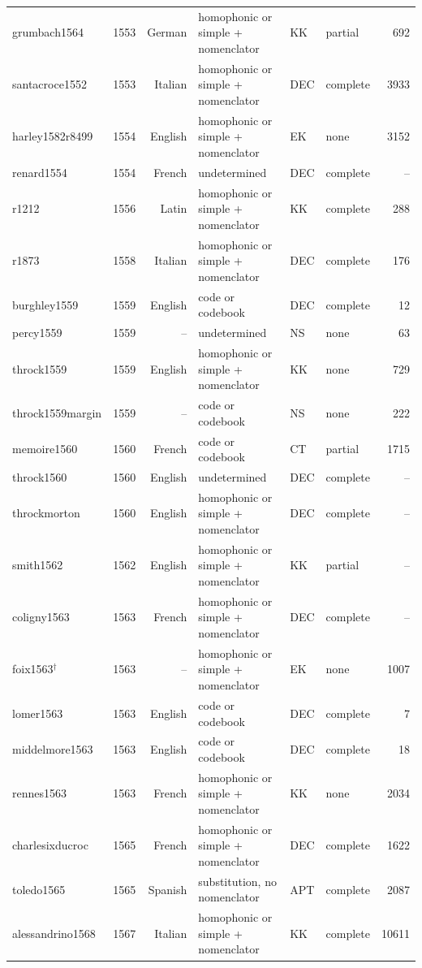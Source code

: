 {\begin{longtable}{@{}llrlllr@{}}
grumbach1564 & 1553 & German & homophonic or simple + nomenclator & KK & partial & 692 \\
santacroce1552 & 1553 & Italian & homophonic or simple + nomenclator & DEC & complete & 3933 \\
harley1582r8499 & 1554 & English & homophonic or simple + nomenclator & EK & none & 3152 \\
renard1554 & 1554 & French & undetermined & DEC & complete & -- \\
r1212 & 1556 & Latin & homophonic or simple + nomenclator & KK & complete & 288 \\
r1873 & 1558 & Italian & homophonic or simple + nomenclator & DEC & complete & 176 \\
burghley1559 & 1559 & English & code or codebook & DEC & complete & 12 \\
percy1559 & 1559 & -- & undetermined & NS & none & 63 \\
throck1559 & 1559 & English & homophonic or simple + nomenclator & KK & none & 729 \\
throck1559margin & 1559 & -- & code or codebook & NS & none & 222 \\
memoire1560 & 1560 & French & code or codebook & CT & partial & 1715 \\
throck1560 & 1560 & English & undetermined & DEC & complete & -- \\
throckmorton & 1560 & English & homophonic or simple + nomenclator & DEC & complete & -- \\
smith1562 & 1562 & English & homophonic or simple + nomenclator & KK & partial & -- \\
coligny1563 & 1563 & French & homophonic or simple + nomenclator & DEC & complete & -- \\
foix1563$^\dagger$ & 1563 & -- & homophonic or simple + nomenclator & EK & none & 1007 \\
lomer1563 & 1563 & English & code or codebook & DEC & complete & 7 \\
middelmore1563 & 1563 & English & code or codebook & DEC & complete & 18 \\
rennes1563 & 1563 & French & homophonic or simple + nomenclator & KK & none & 2034 \\
charlesixducroc & 1565 & French & homophonic or simple + nomenclator & DEC & complete & 1622 \\
toledo1565 & 1565 & Spanish & substitution, no nomenclator & APT & complete & 2087 \\
alessandrino1568 & 1567 & Italian & homophonic or simple + nomenclator & KK & complete & 10611 \\

\end{longtable}}
